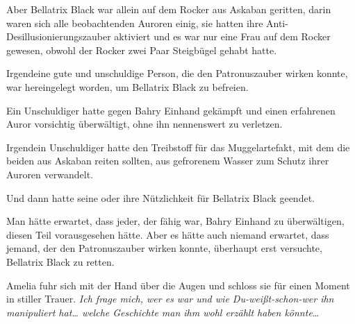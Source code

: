 Aber Bellatrix Black war allein auf dem Rocker aus Askaban geritten, darin waren sich alle beobachtenden Auroren einig, sie hatten ihre Anti-Desillusionierungszauber aktiviert und es war nur eine Frau auf dem Rocker gewesen, obwohl der Rocker zwei Paar Steigbügel gehabt hatte.

Irgendeine gute und unschuldige Person, die den Patronuszauber wirken konnte, war hereingelegt worden, um Bellatrix Black zu befreien.

Ein Unschuldiger hatte gegen Bahry Einhand gekämpft und einen erfahrenen Auror vorsichtig überwältigt, ohne ihn nennenswert zu verletzen.

Irgendein Unschuldiger hatte den Treibstoff für das Muggelartefakt, mit dem die beiden aus Askaban reiten sollten, aus gefrorenem Wasser zum Schutz ihrer Auroren verwandelt.

Und dann hatte seine oder ihre Nützlichkeit für Bellatrix Black geendet.

Man hätte erwartet, dass jeder, der fähig war, Bahry Einhand zu überwältigen, diesen Teil vorausgesehen hätte. Aber es hätte auch niemand erwartet, dass jemand, der den Patronuszauber wirken konnte, überhaupt erst versuchte, Bellatrix Black zu retten.

Amelia fuhr sich mit der Hand über die Augen und schloss sie für einen Moment in stiller Trauer. \emph{Ich frage mich, wer es war und wie Du-weißt-schon-wer ihn manipuliert hat… welche Geschichte man ihm wohl erzählt haben könnte}…

